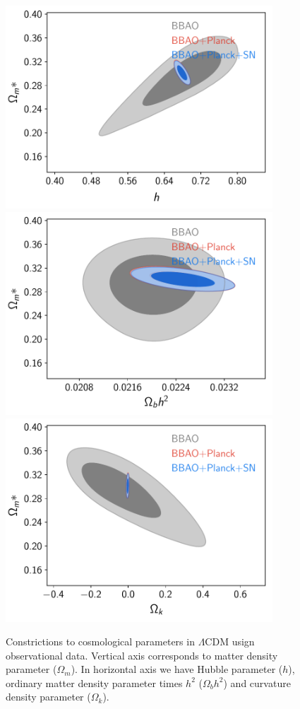 \documentclass[onecolumn,           %
               showpacs,            %
               preprintnumbers,     %
               aps,                 %
               prl,          	    %
               letterpaper,             %
               superscriptaddress,      %
               nofootinbib,         %
               tightenlines,        %
               floats,floatfix      %
               ,usenatbib,
               ]{revtex4-1}
\begin{document}
\begin{figure}[htp]
	\centering
	\includegraphics[width=10cm]{FiguresCosmo/h_Om_cLCDM_todas.pdf}	
	\includegraphics[width=10cm]{FiguresCosmo/Obh2_Om_cLCDM_todas.pdf}
	\includegraphics[width=10cm]{FiguresCosmo/Ok_Om_cLCDM_todas.pdf}
	\caption{Constrictions to cosmological parameters in $\Lambda$CDM usign observational data. Vertical axis corresponds to matter density parameter ($\Omega_m$). In horizontal axis we have Hubble parameter ($h$), ordinary matter density parameter times $h^2$ ($\Omega_b h^2$) and curvature density parameter ($\Omega_k$).}
	\label{cLCDM}
\end{figure}
\end{document}
